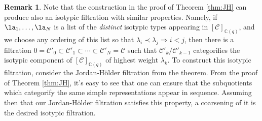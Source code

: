\documentclass[11pt,reqno]{amsart}
\numberwithin{equation}{section}
\newtheorem{Proposition}[equation]{Proposition}
\theoremstyle{definition}
\newtheorem{Remark}[equation]{Remark}
\theoremstyle{named}
\newcommand{\cC}{\mathcal{C}}
\newcommand{\sE}{\mathsf{E}}
\newcommand{\sF}{\mathsf{F}}
\newcommand{\fg}{\mathfrak{g}}
\newcommand{\CC}{\mathbb{C}}
\newcommand{\Hom}{\operatorname{Hom}}
\begin{document}
%
%
%


\begin{Remark}\label{rem:isofilts}
Note that the construction in the proof of Theorem \ref{thm:JH} can produce also an isotypic filtration with similar properties.  Namely, if $\la_1,\hdots,\la_N$ is a list of the \textit{distinct} isotypic types appearing in $[\cC]_{\CC(q)}$, and we choose any ordering of this list so that $\lambda_i \prec \lambda_j \Longrightarrow i <j$, then there is a filtration $0=\cC'_0 \subset \cC'_1\subset \cdots\subset \cC'_N=\cC$ such that $\cC'_{k}/\cC'_{k-1}$ categorifies the isotypic component of $[\cC]_{\CC(q)}$ of highest weight $\lambda_k$.  To construct this isotypic filtration, consider the  Jordan-H\"older filtration  from the theorem.  From the proof of Theorem \ref{thm:JH}, it's easy to see that one can ensure that the subquotients which categorify the same simple representations appear in sequence.  Assuming then that our Jordan-H\"older filtration satisfies this property, a coarsening of it is  the desired isotypic filtration.
\end{Remark}
\end{document}
